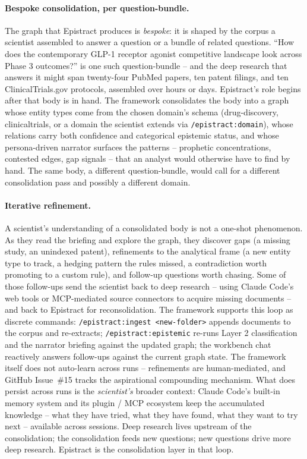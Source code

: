 \paragraph{Bespoke consolidation, per question-bundle.} The graph that Epistract produces is \emph{bespoke}: it is shaped by the corpus a scientist assembled to answer a question or a bundle of related questions. ``How does the contemporary GLP-1 receptor agonist competitive landscape look across Phase 3 outcomes?'' is one such question-bundle -- and the deep research that answers it might span twenty-four PubMed papers, ten patent filings, and ten ClinicalTrials.gov protocols, assembled over hours or days. Epistract's role begins after that body is in hand. The framework consolidates the body into a graph whose entity types come from the chosen domain's schema (drug-discovery, clinicaltrials, or a domain the scientist extends via \texttt{/epistract:domain}), whose relations carry both confidence and categorical epistemic status, and whose persona-driven narrator surfaces the patterns -- prophetic concentrations, contested edges, gap signals -- that an analyst would otherwise have to find by hand. The same body, a different question-bundle, would call for a different consolidation pass and possibly a different domain.

\paragraph{Iterative refinement.} A scientist's understanding of a consolidated body is not a one-shot phenomenon. As they read the briefing and explore the graph, they discover gaps (a missing study, an unindexed patent), refinements to the analytical frame (a new entity type to track, a hedging pattern the rules missed, a contradiction worth promoting to a custom rule), and follow-up questions worth chasing. Some of those follow-ups send the scientist back to deep research -- using Claude Code's web tools or MCP-mediated source connectors to acquire missing documents -- and back to Epistract for reconsolidation. The framework supports this loop as discrete commands: \texttt{/epistract:ingest <new-folder>} appends documents to the corpus and re-extracts; \texttt{/epistract:epistemic} re-runs Layer 2 classification and the narrator briefing against the updated graph; the workbench chat reactively answers follow-ups against the current graph state. The framework itself does not auto-learn across runs -- refinements are human-mediated, and GitHub Issue~\#15 tracks the aspirational compounding mechanism. What does persist across runs is the \emph{scientist's} broader context: Claude Code's built-in memory system and its plugin / MCP ecosystem keep the accumulated knowledge -- what they have tried, what they have found, what they want to try next -- available across sessions. Deep research lives upstream of the consolidation; the consolidation feeds new questions; new questions drive more deep research. Epistract is the consolidation layer in that loop.

